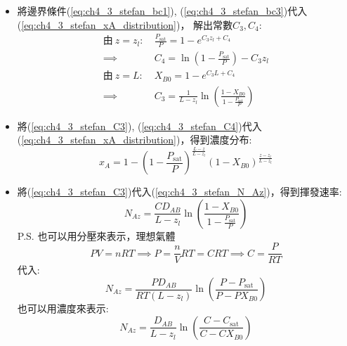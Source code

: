 \documentclass[../main.tex]{subfiles}
\begin{document}
\begin{itemize}
\begin{align}
    \implies \ln(1-x_A) &= C_3 z + C_4 \nonumber\\
    \implies x_A &= 1 - e^{C_3 z + C_4} \label{eq:ch4_3_stefan_xA_distribution}
  \end{align}
  P.S. 其實這裡隱含了$N_{Az}$是常數，而因為$N_{Az}=\frac{W_A}{A}$\\
  此題截面積固定，並假設了Quasi-Steady State，所以揮發速率$W_A$也是定值
  \item 將邊界條件(\ref{eq:ch4_3_stefan_bc1}), (\ref{eq:ch4_3_stefan_bc3})代入(\ref{eq:ch4_3_stefan_xA_distribution})，
  解出常數$C_3, C_4$:
  \begin{align}
    \text{由}~z=z_l:~& \frac{P_{\text{sat}}}{P} = 1 - e^{C_3 z_l + C_4} \nonumber\\
    \implies & C_4 = \ln\left(1 - \frac{P_{\text{sat}}}{P}\right) - C_3 z_l \label{eq:ch4_3_stefan_C4}\\
    \text{由}~z=L:~& X_{B0} = 1 - e^{C_3 L + C_4} \nonumber\\
    \implies & C_3 = \frac{1}{L - z_l} \ln\left(\frac{1 - X_{B0}}{1 - \frac{P_{\text{sat}}}{P}}\right) \label{eq:ch4_3_stefan_C3}
  \end{align}
  \item 將(\ref{eq:ch4_3_stefan_C3}), (\ref{eq:ch4_3_stefan_C4})代入(\ref{eq:ch4_3_stefan_xA_distribution})，得到濃度分布:
  \begin{equation}
    \boxed{x_A = 1 - \left(1 - \frac{P_{\text{sat}}}{P}\right)^{\frac{L-z}{L-z_l}} \left(1 - X_{B0}\right)^{\frac{z - z_l}{L - z_l}}}
  \end{equation}
  \item 將(\ref{eq:ch4_3_stefan_C3})代入(\ref{eq:ch4_3_stefan_N_Az})，得到揮發速率:
  \begin{equation}
    \boxed{N_{Az} = \frac{C D_{AB}}{L - z_l} \ln\left(\frac{1 - X_{B0}}{1 - \frac{P_{\text{sat}}}{P}}\right)}
  \end{equation}
  P.S. 也可以用分壓來表示，理想氣體
  \begin{equation}
    PV = nRT \implies P = \frac{n}{V} RT = CRT  \implies C = \frac{P}{RT}
  \end{equation}
  代入:
  \begin{equation}
    N_{Az} = \frac{P D_{AB}}{RT (L - z_l)}
    \ln\left(\frac{P - P_{\text{sat}}}{P - P X_{B0}}\right)
  \end{equation}
  也可以用濃度來表示:
  \begin{equation}
    N_{Az} = \frac{D_{AB}}{L - z_l}
    \ln\left(\frac{C - C_{\text{sat}}}{C - C X_{B0}}\right)
  \end{equation}

\end{itemize}
\end{document}
